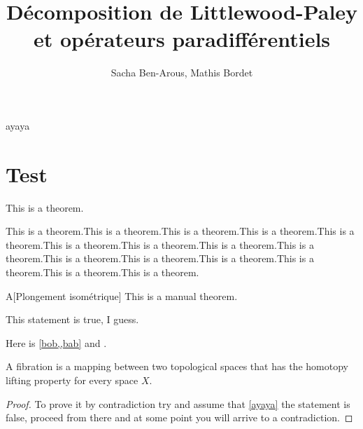\documentclass[11pt,a4paper]{article}
\title{\textbf{Décomposition de Littlewood-Paley et opérateurs paradifférentiels}}
\date{}
\author{Sacha Ben-Arous, Mathis Bordet}
\begin{document}
\maketitle
ayaya

\section{Test}

\begin{thm}\label{bob}
This is a theorem.
\end{thm}

\begin{lemma}\label{bab}
This is a theorem.This is a theorem.This is a theorem.This is a theorem.This is a theorem.This is a theorem.This is a theorem.This is a theorem.This is a theorem.This is a theorem.This is a theorem.This is a theorem.This is a theorem.This is a theorem.This is a theorem.
\end{lemma}

\begin{mth}{A}[Plongement isométrique]\label{foo}
This is a manual theorem.
\end{mth}

\begin{rmq}
This statement is true, I guess.
\end{rmq}

Here is \cref{bob,,bab} and .

\begin{defin}[Fibration]\label{ayaya}
A fibration is a mapping between two topological spaces that has the homotopy lifting property for every space \(X\).
\end{defin}

\begin{proof}
To prove it by contradiction try and assume that \cref{ayaya} the statement is false,
proceed from there and at some point you will arrive to a contradiction.
\end{proof}
\end{document}
